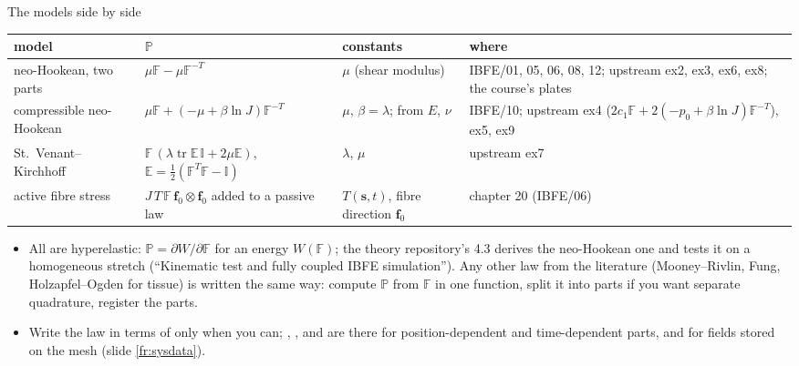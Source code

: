 \documentclass[aspectratio=169,11pt]{beamer}
\begin{document}
\begin{frame}{The models side by side}
\label{fr:models}
\scriptsize
\begin{tabular}{@{}L{0.20\textwidth}L{0.30\textwidth}L{0.18\textwidth}L{0.22\textwidth}@{}}
\toprule
model & $\mathbb{P}$ & constants & where \\
\midrule
neo-Hookean, two parts & $\mu\mathbb{F} - \mu\mathbb{F}^{-T}$ & $\mu$ (shear modulus) & IBFE/01, 05, 06, 08, 12; upstream ex2, ex3, ex6, ex8; the course's plates \\
compressible neo-Hookean & $\mu\mathbb{F} + (-\mu + \beta\ln J)\mathbb{F}^{-T}$ & $\mu$, $\beta = \lambda$; from $E$, $\nu$ & IBFE/10; upstream ex4 ($2c_1\mathbb{F} + 2(-p_0 + \beta\ln J)\mathbb{F}^{-T}$), ex5, ex9 \\
St.\ Venant--Kirchhoff & $\mathbb{F}\,(\lambda\operatorname{tr}\mathbb{E}\,\mathbb{I} + 2\mu\mathbb{E})$, $\mathbb{E} = \tfrac12(\mathbb{F}^T\mathbb{F} - \mathbb{I})$ & $\lambda$, $\mu$ & upstream ex7 \\
active fibre stress & $J\,T\,\mathbb{F}\,\mathbf{f}_0\otimes\mathbf{f}_0$ added to a passive law & $T(\mathbf{s}, t)$, fibre direction $\mathbf{f}_0$ & chapter 20 (IBFE/06) \\
\bottomrule
\end{tabular}

\medskip
\begin{itemize}
  \item All are hyperelastic: $\mathbb{P} = \partial W/\partial\mathbb{F}$ for an energy $W(\mathbb{F})$; the theory repository's 4.3 derives the neo-Hookean one and tests it on a homogeneous stretch (``Kinematic test and fully coupled IBFE simulation''). Any other law from the literature (Mooney--Rivlin, Fung, Holzapfel--Ogden for tissue) is written the same way: compute $\mathbb{P}$ from $\mathbb{F}$ in one function, split it into parts if you want separate quadrature, register the parts.
  \item Write the law in terms of  only when you can; , ,  and  are there for position-dependent and time-dependent parts, and  for fields stored on the mesh (slide \ref{fr:sysdata}).
\end{itemize}
\end{frame}
\end{document}
